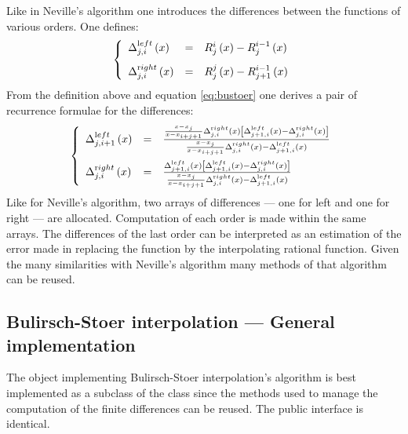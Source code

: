 Like in Neville's algorithm one introduces the differences between
the functions of various orders. One defines:
\begin{equation}
\left\{
\begin{array}{lcl}
    \Delta_{j,i}^{\mathop{\textrm
left}}\left(x\right) & = & R_j^i\left(x\right) -
R_j^{i-1}\left(x\right)\\*[2ex]
    \Delta_{j,i}^{\mathop{\textrm
right}}\left(x\right) & = & R_j^j\left(x\right) -
R_{j+1}^{i-1}\left(x\right)
  \end{array}\right.
\end{equation}
From the definition above and equation \ref{eq:bustoer} one
derives a pair of recurrence formulae for the differences:
\begin{equation}
\left\{
\begin{array}{lcl}
    \Delta_{j,i+1}^{\mathop{\textrm
left}}\left(x\right) & = &{{x-x_j \over x - x_{i+j+1}}
\Delta_{j,i}^{\mathop{\textrm right}}\left(x\right)
\left[\Delta_{j+1,i}^{\mathop{\textrm left}}\left(x\right) -
\Delta_{j,i}^{\mathop{\textrm right}}\left(x\right)\right] \over
{x-x_j \over x-x_{i+j+1}} \Delta_{j,i}^{\mathop{\textrm
right}}\left(x\right) - \Delta_{j+1,i}^{\mathop{\textrm
left}}\left(x\right)}
\\*[3ex]
    \Delta_{j,i}^{\mathop{\textrm
right}}\left(x\right) & = &{ \Delta_{j+1,i}^{\mathop{\textrm
left}}\left(x\right) \left[\Delta_{j+1,i}^{\mathop{\textrm
left}}\left(x\right) - \Delta_{j,i}^{\mathop{\textrm
right}}\left(x\right)\right] \over {x-x_j \over x-x_{i+j+1}}
\Delta_{j,i}^{\mathop{\textrm right}}\left(x\right) -
\Delta_{j+1,i}^{\mathop{\textrm left}}\left(x\right)}
  \end{array}\right.
\end{equation}
Like for Neville's algorithm, two arrays of differences --- one
for left and one for right --- are allocated. Computation of each
order is made within the same arrays. The differences of the last
order can be interpreted as an estimation of the error made in
replacing the function by the interpolating rational function.
Given the many similarities with Neville's algorithm many methods
of that algorithm can be reused.

\subsection{Bulirsch-Stoer interpolation --- General implementation}
 The object implementing
Bulirsch-Stoer interpolation's algorithm is best implemented as a
subclass of the class  since the
methods used to manage the computation of the finite differences
can be reused. The public interface is identical.

